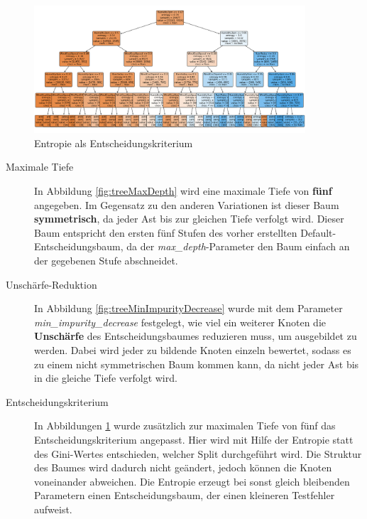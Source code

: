 \begin{figure}[H]
\begin{minipage}{0.30\textwidth}
    \end{minipage}\hfill
    \begin{minipage}{0.30\textwidth}
        \centering
        \includegraphics[width=0.9\textwidth]{Bilder/treeCriterion} %
        \caption{Entropie als Entscheidungskriterium}
        \label{fig:treeCriterion}
    \end{minipage}
\end{figure}
\begin{description}
	\item[Maximale Tiefe]
	In Abbildung \ref{fig:treeMaxDepth} wird eine maximale Tiefe von \textbf{fünf} angegeben. Im Gegensatz zu den anderen Variationen ist dieser Baum \textbf{symmetrisch}, da jeder Ast bis zur gleichen Tiefe verfolgt wird. Dieser Baum entspricht den ersten fünf Stufen des vorher erstellten Default-Entscheidungsbaum, da der \emph{max\_depth}-Parameter den Baum einfach an der gegebenen Stufe abschneidet. %
	\item[Unschärfe-Reduktion] 
	In Abbildung \ref{fig:treeMinImpurityDecrease} wurde mit dem Parameter \emph{min\_impurity\_decrease} festgelegt, wie viel ein weiterer Knoten die \textbf{Unschärfe} des Entscheidungsbaumes reduzieren muss, um ausgebildet zu werden. Dabei wird jeder zu bildende Knoten einzeln bewertet, sodass es zu einem nicht symmetrischen Baum kommen kann, da nicht jeder Ast bis in die gleiche Tiefe verfolgt wird.
	\item[Entscheidungskriterium]
	In Abbildungen \ref{fig:treeCriterion} wurde zusätzlich zur maximalen Tiefe von fünf das Entscheidungskriterium angepasst. Hier wird mit Hilfe der Entropie statt des Gini-Wertes entschieden, welcher Split durchgeführt wird. Die Struktur des Baumes wird dadurch nicht geändert, jedoch können die Knoten voneinander abweichen. Die Entropie erzeugt bei sonst gleich bleibenden Parametern einen Entscheidungsbaum, der einen kleineren Testfehler aufweist.
\end{description}
